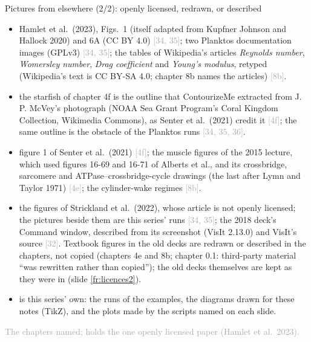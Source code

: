 \documentclass[aspectratio=169,11pt]{beamer}
\newcommand{\sourcecredit}[1]{\vfill\begin{flushright}\tiny\textcolor{DarkGray}{#1}\end{flushright}}
\newcommand{\ch}[1]{\textcolor{DarkGray}{[#1]}}
\begin{document}
\begin{frame}{Pictures from elsewhere (2/2): openly licensed, redrawn, or described}
\label{fr:pics2}
\scriptsize
\begin{itemize}\setlength{\itemsep}{2pt}
  \item {} Hamlet et al.\ (2023), Figs.~1 (itself adapted from Kupfner Johnson and Hallock 2020) and 6A (CC BY 4.0) \ch{34, 35}; two Planktos documentation images (GPLv3) \ch{34, 35}; the tables of Wikipedia's articles \emph{Reynolds number}, \emph{Womersley number}, \emph{Drag coefficient} and \emph{Young's modulus}, retyped (Wikipedia's text is CC BY-SA 4.0; chapter 8b names the articles) \ch{8b}.
  \item {} the starfish of chapter 4f is the outline that ContourizeMe extracted from J. P. McVey's photograph (NOAA Sea Grant Program's Coral Kingdom Collection, Wikimedia Commons), as Senter et al.\ (2021) credit it \ch{4f}; the same outline is the obstacle of the Planktos runs \ch{34, 35, 36}.
  \item {} figure 1 of Senter et al.\ (2021) \ch{4f}; the muscle figures of the 2015 lecture, which used figures 16-69 and 16-71 of Alberts et al., and its crossbridge, sarcomere and ATPase--crossbridge-cycle drawings (the last after Lymn and Taylor 1971) \ch{4e}; the cylinder-wake regimes \ch{8b}.
  \item {} the figures of Strickland et al.\ (2022), whose article is not openly licensed; the pictures beside them are this series' runs \ch{34, 35}; the 2018 deck's Command window, described from its screenshot (VisIt 2.13.0) and VisIt's source \ch{32}. Textbook figures in the old decks are redrawn or described in the chapters, not copied (chapters 4e and 8b; chapter 0.1: third-party material ``was rewritten rather than copied''); the old decks themselves are kept as they were in  (slide \ref{fr:licences2}).
  \item {} is this series' own: the runs of the examples, the diagrams drawn for these notes (TikZ), and the plots made by the scripts named on each slide.
\end{itemize}
\sourcecredit{The chapters named;  holds the one openly licensed paper (Hamlet et al.\ 2023).}
\end{frame}
\end{document}
